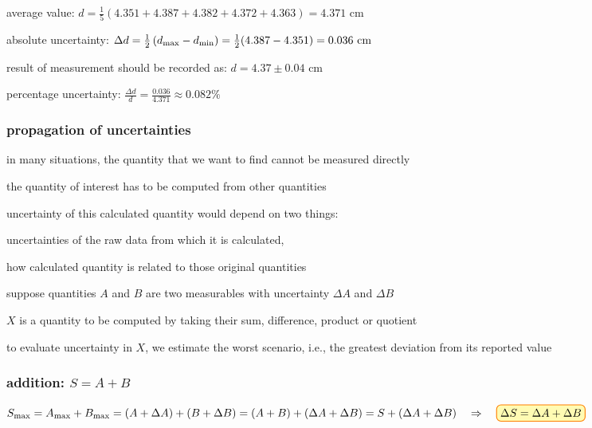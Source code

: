 
\sol average value: $d = \frac{1}{5}(4.351+4.387+4.382+4.372+4.363) = 4.371 \text{ cm}$

absolute uncertainty: $\Delta d = \frac{1}{2}\left(d_{\text{max}}-d_{\text{min}}\right) = \frac{1}{2}(4.387-4.351) = 0.036 \text{ cm}$

result of measurement should be recorded as: $ d = 4.37 \pm 0.04 \text{ cm}$

percentage uncertainty: $\frac{\Delta d}{d} = \frac{0.036}{4.371} \approx 0.082\%$   \eoe




\subsubsection{propagation of uncertainties}

in many situations, the quantity that we want to find cannot be measured directly

the quantity of interest has to be computed from other quantities

uncertainty of this calculated quantity would depend on two things:

\titem uncertainties of the raw data from which it is calculated,

\titem how calculated quantity is related to those original quantities

\vspace*{\baselineskip}

suppose quantities $A$ and $B$ are two measurables with uncertainty $\Delta A$ and $\Delta B$ 

$X$ is a quantity to be computed by taking their sum, difference, product or quotient

to evaluate uncertainty in $X$, we estimate the worst scenario, i.e., the greatest deviation from its reported value

\subsubsection*{addition: $S=A+B$}

$S_\tmax = A_\tmax + B_\tmax = (A + \Delta A) + (B + \Delta B) = (A+B) + (\Delta A + \Delta B)= S + (\Delta A + \Delta B) \RA \boxed{\Delta S = \Delta A + \Delta B}$

